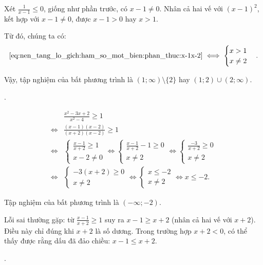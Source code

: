 Xét $\frac{1}{x - 1} \leq 0$, giống như phần trước, có $x - 1 \neq 0$. Nhân cả hai vế với $(x - 1)^2$, kết hợp với $x - 1 \neq 0$, được $x - 1 > 0$ hay $x > 1$.

Từ đó, chúng ta có:
$$\eqref{eq:nen_tang_lo_gich:ham_so_mot_bien:phan_thuc:x-1x-2} \iff \begin{cases}
   x > 1 \\
   x \neq 2
\end{cases}.$$

Vậy, tập nghiệm của bất phương trình là $\left(1; \infty\right) \setminus \{2\}$ hay $\left(1; 2\right) \cup \left(2; \infty\right)$.

.

\begin{align*}
   &\frac{x^2 - 3x + 2}{x^2 - 4} \geq 1 \\
   \iff &\frac{(x - 1)(x - 2)}{(x + 2)(x - 2)} \geq 1 \\
   \iff &\begin{cases}
      \frac{x - 1}{x + 2} \geq 1 \\
      x - 2 \neq 0
   \end{cases} 
   \iff \begin{cases}
      \frac{x - 1}{x + 2} - 1 \geq 0 \\
      x \neq 2
   \end{cases} 
   \iff \begin{cases}
      \frac{-3}{x + 2} \geq 0 \\
      x \neq 2
   \end{cases} \\
   \iff &\begin{cases}
      -3(x + 2) \geq 0 \\
      x \neq 2
   \end{cases} 
   \iff \begin{cases}
      x \leq -2\\
      x \neq 2
   \end{cases} \iff x \leq -2.
\end{align*}

Tập nghiệm của bất phương trình là $\left(-\infty; -2\right)$.

Lỗi sai thường gặp: từ $\frac{x - 1}{x + 2} \geq 1$ suy ra $x - 1 \geq x + 2$ (nhân cả hai vế với $x + 2$). Điều này chỉ đúng khi $x + 2$ là số dương. Trong trường hợp $x + 2 < 0$, có thể thấy được rằng dấu đã đảo chiều:  $x - 1 \leq x + 2$.

.

